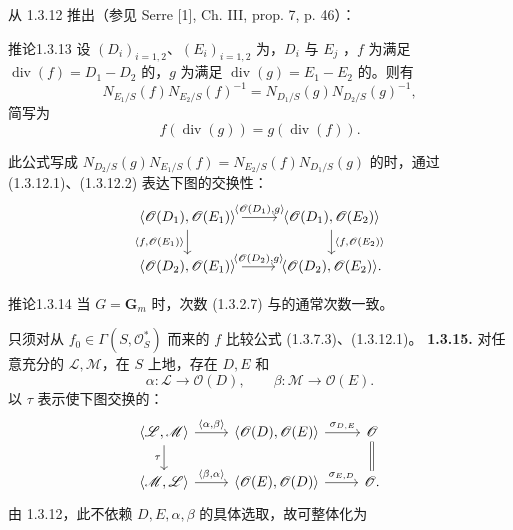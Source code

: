 从 1.3.12 推出（参见 Serre [1], Ch. III, prop. 7, p. 46）：
\begin{SGAresult}{推论}{1.3.13}
设 $(D_i)_{i=1,2}$、$(E_i)_{i=1,2}$ 为，$D_i$ 与 $E_j$ ，$f$ 为满足 $\operatorname{div}(f)=D_1-D_2$ 的，$g$ 为满足 $\operatorname{div}(g)=E_1-E_2$ 的。则有
\[N_{E_1/S}(f)N_{E_2/S}(f)^{-1}=N_{D_1/S}(g)N_{D_2/S}(g)^{-1},\]
简写为
\begin{equation}f(\operatorname{div}(g))=g(\operatorname{div}(f)).\tag{1.3.13.1}\end{equation}
\end{SGAresult}
此公式写成 $N_{D_2/S}(g)N_{E_1/S}(f)=N_{E_2/S}(f)N_{D_1/S}(g)$ 的时，通过 (1.3.12.1)、(1.3.12.2) 表达下图的交换性：
\[\begin{tikzcd}\langle\mathscr O(D_1),\mathscr O(E_1)\rangle\ar[r,"{\langle\mathscr O(D_1),g\rangle}"]\ar[d,"{\langle f,\mathscr O(E_1)\rangle}"']&\langle\mathscr O(D_1),\mathscr O(E_2)\rangle\ar[d,"{\langle f,\mathscr O(E_2)\rangle}"]\\\langle\mathscr O(D_2),\mathscr O(E_1)\rangle\ar[r,"{\langle\mathscr O(D_2),g\rangle}"]&\langle\mathscr O(D_2),\mathscr O(E_2)\rangle.\end{tikzcd}\]
\begin{SGAresult}{推论}{1.3.14}
当 $G=\mathbf G_m$ 时，次数 (1.3.2.7) 与的通常次数一致。
\end{SGAresult}
只须对从 $f_0\in\Gamma(S,\mathscr O_S^*)$ 而来的 $f$ 比较公式 (1.3.7.3)、(1.3.12.1)。
\textbf{1.3.15.} 对任意充分的 $\mathscr L,\mathscr M$，在 $S$ 上地，存在 $D,E$ 和
\[\alpha:\mathscr L\longrightarrow\mathscr O(D),\qquad\beta:\mathscr M\longrightarrow\mathscr O(E).\]
以 $\tau$ 表示使下图交换的：
\[\begin{tikzcd}\langle\mathscr L,\mathscr M\rangle\ar[r,"{\langle\alpha,\beta\rangle}"]\ar[d,"\tau"']&\langle\mathscr O(D),\mathscr O(E)\rangle\ar[r,"{\sigma_{D,E}}"]&\mathscr O\ar[d,equal]\\\langle\mathscr M,\mathscr L\rangle\ar[r,"{\langle\beta,\alpha\rangle}"]&\langle\mathscr O(E),\mathscr O(D)\rangle\ar[r,"{\sigma_{E,D}}"]&\mathscr O.\end{tikzcd}\]
由 1.3.12，此不依赖 $D,E,\alpha,\beta$ 的具体选取，故可整体化为
